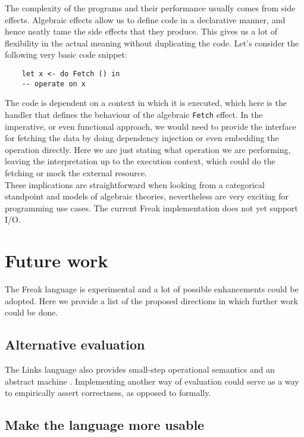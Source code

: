 \documentclass{article}
\theoremstyle{definition}
\theoremstyle{lemma}
\theoremstyle{observation}
\theoremstyle{theorem}
\begin{document}
    The complexity of the programs and their performance usually comes from side effects.
    Algebraic effects allow us to define code in a declarative manner, and hence
    neatly tame the side effects that they produce. This gives us a lot of flexibility
    in the actual meaning without duplicating the code. Let's consider the following
    very basic code snippet:

    \begin{verbatim}
    let x <- do Fetch () in
    -- operate on x
    \end{verbatim}

    The code is dependent on a context in which it is executed, which here is
    the handler that defines the behaviour of the algebraic \verb!Fetch! effect.
    In the imperative, or even functional approach, we would need to provide
    the interface for fetching the data by doing dependency injection or even
    embedding the operation directly. Here we are just stating what operation
    we are performing, leaving the interpretation up to the execution context,
    which could do the fetching or mock the external resource. \\

    These implications are straightforward when looking from a categorical
    standpoint and models of algebraic theories, nevertheless are very exciting
    for programming use cases. The current Freak implementation does not yet support I/O.

\section{Future work}

    The Freak language is experimental and a lot of possible enhancements
    could be adopted. Here we provide a list of the proposed directions in which
    further work could be done.

    \subsection{Alternative evaluation}

    The Links language also provides small-step operational semantics and
    an abstract machine \cite{liberating-effects}. Implementing another way
    of evaluation could serve as a way to empirically assert correctness,
    as opposed to formally.

    \subsection{Make the language more usable}
\end{document}
